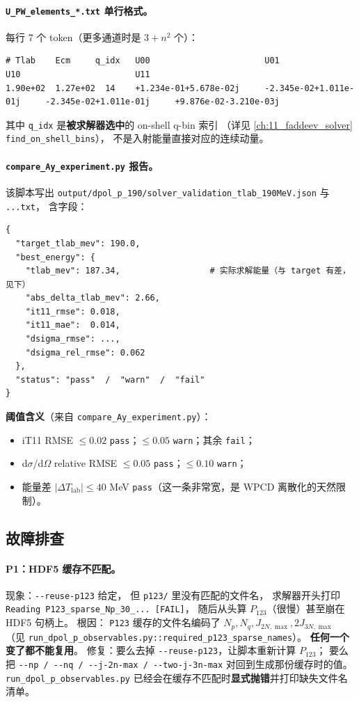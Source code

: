 \paragraph{\texttt{U\_PW\_elements\_*.txt} 单行格式。}
每行 7 个 token（更多通道时是 $3+n^2$ 个）：
\begin{lstlisting}[style=config]
# Tlab    Ecm     q_idx   U00                       U01                       U10                       U11
1.90e+02  1.27e+02  14    +1.234e-01+5.678e-02j     -2.345e-02+1.011e-01j     -2.345e-02+1.011e-01j     +9.876e-02-3.210e-03j
\end{lstlisting}
其中 \texttt{q\_idx} 是\textbf{被求解器选中}的 on-shell q-bin 索引
（详见 \cref{ch:11_faddeev_solver} \texttt{find\_on\_shell\_bins}），
不是入射能量直接对应的连续动量。

\paragraph{\texttt{compare\_Ay\_experiment.py} 报告。}
该脚本写出 \texttt{output/dpol\_p\_190/solver\_validation\_tlab\_190MeV.json}
与 \texttt{...txt}，
含字段：
\begin{lstlisting}[style=config]
{
  "target_tlab_mev": 190.0,
  "best_energy": {
    "tlab_mev": 187.34,                  # 实际求解能量（与 target 有差，见下）
    "abs_delta_tlab_mev": 2.66,
    "it11_rmse": 0.018,
    "it11_mae":  0.014,
    "dsigma_rmse": ...,
    "dsigma_rel_rmse": 0.062
  },
  "status": "pass"  /  "warn"  /  "fail"
}
\end{lstlisting}
\textbf{阈值含义}（来自 \texttt{compare\_Ay\_experiment.py}）：
\begin{itemize}
  \item iT11 RMSE $\le 0.02$ \texttt{pass}；$\le 0.05$ \texttt{warn}；其余 \texttt{fail}；
  \item d$\sigma$/d$\Omega$ relative RMSE $\le 0.05$ \texttt{pass}；$\le 0.10$ \texttt{warn}；
  \item 能量差 $|\Delta T_{\mathrm{lab}}| \le 40$ MeV \texttt{pass}（这一条非常宽，是 WPCD 离散化的天然限制）。
\end{itemize}

\subsection{故障排查}
\label{sec:ch20-s1-pitfalls}

\paragraph{P1：HDF5 缓存不匹配。}
现象：\texttt{-{}-reuse-p123} 给定，
但 \texttt{p123/} 里没有匹配的文件名，
求解器开头打印
\texttt{Reading P123\_sparse\_Np\_30\_... [FAIL]}，
随后从头算 $P_{123}$（很慢）甚至崩在 HDF5 句柄上。
根因：
\texttt{P123} 缓存的文件名编码了
$N_p, N_q, J_{2N,\max}, 2J_{3N,\max}$
（见 \texttt{run\_dpol\_p\_observables.py::required\_p123\_sparse\_names}）。
\textbf{任何一个变了都不能复用}。
修复：要么去掉 \texttt{-{}-reuse-p123}，让脚本重新计算 $P_{123}$；
要么把 \texttt{-{}-np / -{}-nq / -{}-j-2n-max / -{}-two-j-3n-max}
对回到生成那份缓存时的值。
\texttt{run\_dpol\_p\_observables.py} 已经会在缓存不匹配时\textbf{显式抛错}并打印缺失文件名清单。

